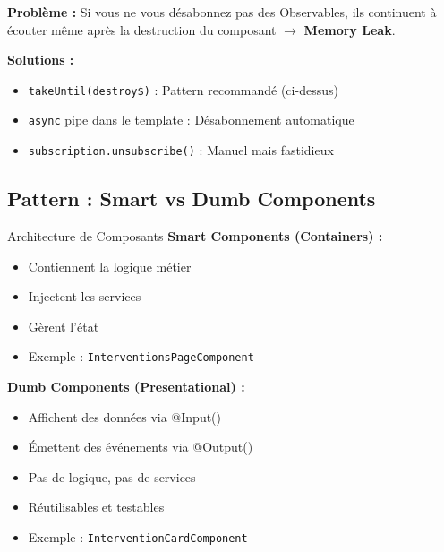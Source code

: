 \documentclass[12pt,a4paper]{article}
\begin{document}
\begin{warningbox}[title={\faExclamationTriangle\ Memory Leaks en Angular}]
\textbf{Problème :} Si vous ne vous désabonnez pas des Observables, ils continuent à écouter même après la destruction du composant $\rightarrow$ \textbf{Memory Leak}.

\textbf{Solutions :}
\begin{itemize}
    \item \texttt{takeUntil(destroy\$)} : Pattern recommandé (ci-dessus)
    \item \texttt{async} pipe dans le template : Désabonnement automatique
    \item \texttt{subscription.unsubscribe()} : Manuel mais fastidieux
\end{itemize}
\end{warningbox}

\subsection{Pattern : Smart vs Dumb Components}

\begin{defbox}{Architecture de Composants}
\textbf{Smart Components (Containers) :}
\begin{itemize}
    \item Contiennent la logique métier
    \item Injectent les services
    \item Gèrent l'état
    \item Exemple : \texttt{InterventionsPageComponent}
\end{itemize}

\textbf{Dumb Components (Presentational) :}
\begin{itemize}
    \item Affichent des données via @Input()
    \item Émettent des événements via @Output()
    \item Pas de logique, pas de services
    \item Réutilisables et testables
    \item Exemple : \texttt{InterventionCardComponent}
\end{itemize}
\end{defbox}

\newpage

\end{document}
